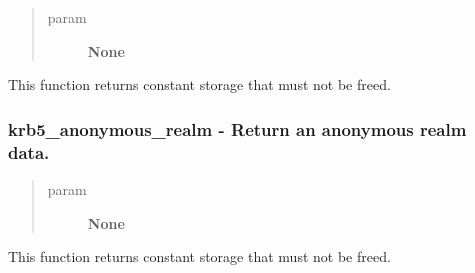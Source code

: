 \documentclass[letterpaper,10pt,english]{sphinxmanual}
\begin{document}
\begin{fulllineitems}
\label{appdev/refs/api/krb5_anonymous_principal:c.krb5_anonymous_principal}
\end{fulllineitems}

\begin{quote}\begin{description}
\item[{param}] \leavevmode
\textbf{None}

\end{description}\end{quote}

This function returns constant storage that must not be freed.




{\hyperref[appdev/refs/macros/KRB5_ANONYMOUS_PRINCSTR:KRB5_ANONYMOUS_PRINCSTR]{}}




\subsubsection{krb5\_anonymous\_realm -  Return an anonymous realm data.}
\label{appdev/refs/api/krb5_anonymous_realm::doc}\label{appdev/refs/api/krb5_anonymous_realm:krb5-anonymous-realm-return-an-anonymous-realm-data}

\begin{fulllineitems}
\label{appdev/refs/api/krb5_anonymous_realm:c.krb5_anonymous_realm}
\end{fulllineitems}

\begin{quote}\begin{description}
\item[{param}] \leavevmode
\textbf{None}

\end{description}\end{quote}

This function returns constant storage that must not be freed.




{\hyperref[appdev/refs/macros/KRB5_ANONYMOUS_REALMSTR:KRB5_ANONYMOUS_REALMSTR]{}}
\end{document}
